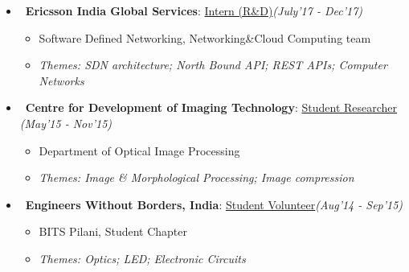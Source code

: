 \documentclass[margin,line]{templates/resume}
\newcommand{\compresslist}{%
\setlength{\itemsep}{3pt}%
\setlength{\parskip}{0pt}%
\setlength{\parsep}{0pt}%
}
\begin{document}
\begin{resume}
\begin{itemize}[leftmargin = 0.7cm]
\item~\textbf{Ericsson India Global Services}: \href{https://www.ericsson.com/ourportfolio/digital-services-solution-areas/cloud-sdn?nav=fgb_101_0363}{Intern (R\&D)}\hfill{\small\textit{(July'17 - Dec'17)}}                                                                                             
\vspace{-1mm}
\begin{itemize}[leftmargin=*]\compresslist
    \item[]\small Software Defined Networking, Networking\&Cloud Computing team \vspace{-1mm} 
        \item[]\small\textit{Themes: SDN architecture; North Bound API; REST APIs; Computer Networks}   
    \end{itemize}

\item~\textbf{Centre for Development of Imaging Technology}: \href{http://www.cdit.org/}{Student Researcher} \hfill{\small\textit{(May'15 - Nov'15)}}
\vspace{-1mm}
\begin{itemize}[leftmargin=*]\compresslist
      \item[]\small Department of Optical Image Processing\vspace{-1mm}
        \item[]\small\textit{Themes:  Image \& Morphological Processing; Image compression}
    \end{itemize}
\item~\textbf{Engineers Without Borders, India}: {\href{http://www.ewb-india.org/}{Student Volunteer}}\hfill{\small\textit{(Aug'14 - Sep'15)}}
\vspace{-1mm}
\begin{itemize}[leftmargin=*]\compresslist
       \item[]\small BITS Pilani, Student Chapter\vspace{-1mm}
        \item[]\small\textit{Themes: Optics; LED; Electronic Circuits}
    \end{itemize}
    \end{itemize}
\vspace{-0.1cm}

\end{resume}
\end{document}
